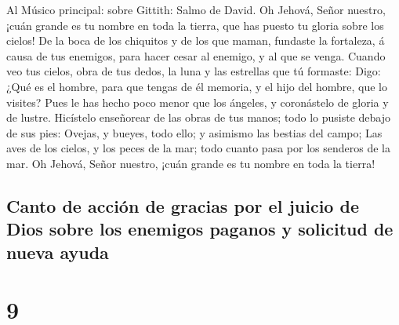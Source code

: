  Al Músico principal: sobre Gittith: Salmo de David. Oh
Jehová, Señor nuestro, ¡cuán grande es tu nombre en toda la tierra, que
has puesto tu gloria sobre los cielos!  De la boca de los
chiquitos y de los que maman, fundaste la fortaleza, á causa de tus
enemigos, para hacer cesar al enemigo, y al que se venga. 
Cuando veo tus cielos, obra de tus dedos, la luna y las estrellas que tú
formaste:  Digo: ¿Qué es el hombre, para que tengas de él
memoria, y el hijo del hombre, que lo visites?  Pues le
has hecho poco menor que los ángeles, y coronástelo de gloria y de
lustre.  Hicístelo enseñorear de las obras de tus manos;
todo lo pusiste debajo de sus pies:  Ovejas, y bueyes,
todo ello; y asimismo las bestias del campo;  Las aves de
los cielos, y los peces de la mar; todo cuanto pasa por los senderos de
la mar.  Oh Jehová, Señor nuestro, ¡cuán grande es tu
nombre en toda la tierra!

\hypertarget{canto-de-acciuxf3n-de-gracias-por-el-juicio-de-dios-sobre-los-enemigos-paganos-y-solicitud-de-nueva-ayuda}{%
\subsection{Canto de acción de gracias por el juicio de Dios sobre los
enemigos paganos y solicitud de nueva
ayuda}\label{canto-de-acciuxf3n-de-gracias-por-el-juicio-de-dios-sobre-los-enemigos-paganos-y-solicitud-de-nueva-ayuda}}

\hypertarget{section-8}{%
\section{9}\label{section-8}}

